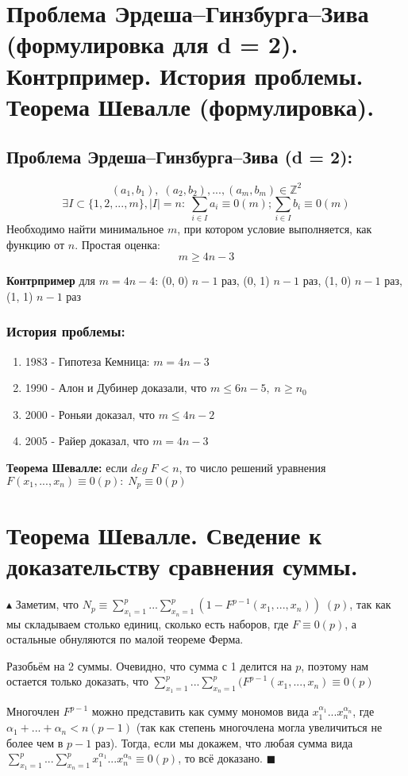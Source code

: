 \setcounter{section}{65}

\section{Проблема Эрдеша–Гинзбурга–Зива (формулировка для d = 2). Контрпример. История проблемы. Теорема Шевалле (формулировка).}
\subsection*{Проблема Эрдеша–Гинзбурга–Зива (d = 2):}
$$(a_1, b_1), \; (a_2, b_2), ..., (a_m, b_m) \in \mathbb{Z}^2$$
$$\exists I \subset \{ 1, 2, ..., m\}, |I|=n: \; \sum_{i \in I}a_i \equiv 0(m); \sum_{i \in I}b_i \equiv 0(m)$$
Необходимо найти минимальное $m$, при котором условие выполняется, как функцию от $n$. Простая оценка:
$$m \geq 4n-3$$
\par \textbf{Контрпример} для $m=4n-4$: (0, 0) $n-1$ раз, (0, 1) $n-1$ раз, (1, 0) $n-1$ раз, (1, 1) $n-1$ раз 
\subsubsection*{История проблемы:}
\begin{enumerate}
    \item 1983 - Гипотеза Кемница: $m=4n-3$
    \item 1990 - Алон и Дубинер доказали, что $m \leq 6n-5, \; n \geq n_0$
    \item 2000 - Роньяи доказал, что $m \leq 4n-2$
    \item 2005 - Райер доказал, что $m=4n-3$
\end{enumerate}
\par \textbf{Теорема Шевалле:} если $deg \; F < n$, то число решений уравнения $F(x_1, ..., x_n) \equiv 0 (p): \; N_p \equiv 0(p)$

\section{Теорема Шевалле. Сведение к доказательству сравнения суммы.}
\par $\blacktriangle$ Заметим, что $N_p \equiv \sum_{x_1=1}^p...\sum_{x_n=1}^p(1-F^{p-1}(x_1, ..., x_n)) \; (p)$, так как мы складываем столько единиц, сколько есть наборов, где $F \equiv 0(p)$, а остальные обнуляются по малой теореме Ферма. 
\par Разобьём на 2 суммы. Очевидно, что сумма с 1 делится на $p$, поэтому нам остается только доказать, что $\sum\limits_{x_1=1}^p...\sum\limits_{x_n=1}^p(F^{p-1}(x_1, ..., x_n) \equiv 0 (p)$
\par Многочлен $F^{p-1}$ можно представить как сумму мономов вида $x_1^{\alpha_1}...x_n^{\alpha_n}$, где $\alpha_1 + ... + \alpha_n < n(p-1)$ (так как степень многочлена могла увеличиться не более чем в $p-1$ раз). Тогда, если мы докажем, что любая сумма вида $\sum\limits_{x_1=1}^p...\sum\limits_{x_n=1}^px_1^{\alpha_1}...x_n^{\alpha_n} \equiv 0 (p)$, то всё доказано. $\blacksquare$

